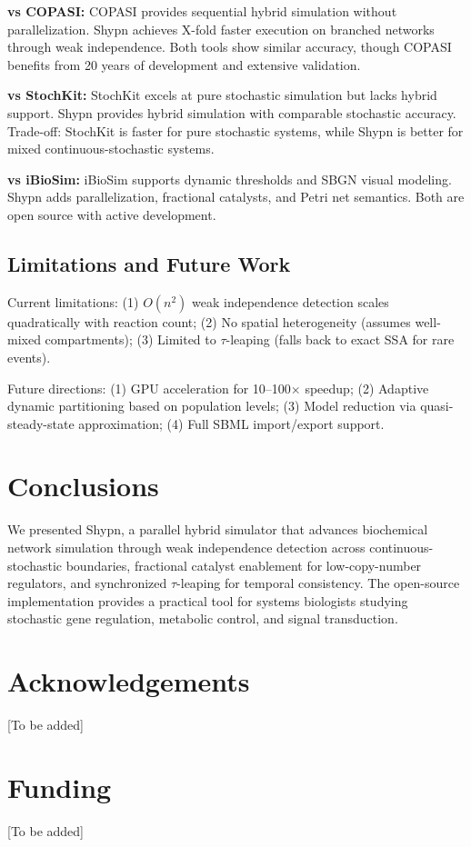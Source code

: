 \documentclass{bioinfo}
\begin{document}
\textbf{vs COPASI:} COPASI provides sequential hybrid simulation without parallelization. Shypn achieves X-fold faster execution on branched networks through weak independence. Both tools show similar accuracy, though COPASI benefits from 20 years of development and extensive validation.

\textbf{vs StochKit:} StochKit excels at pure stochastic simulation but lacks hybrid support. Shypn provides hybrid simulation with comparable stochastic accuracy. Trade-off: StochKit is faster for pure stochastic systems, while Shypn is better for mixed continuous-stochastic systems.

\textbf{vs iBioSim:} iBioSim supports dynamic thresholds and SBGN visual modeling. Shypn adds parallelization, fractional catalysts, and Petri net semantics. Both are open source with active development.

\subsection{Limitations and Future Work}

Current limitations: (1) $O(n^2)$ weak independence detection scales quadratically with reaction count; (2) No spatial heterogeneity (assumes well-mixed compartments); (3) Limited to $\tau$-leaping (falls back to exact SSA for rare events).

Future directions: (1) GPU acceleration for 10--100$\times$ speedup; (2) Adaptive dynamic partitioning based on population levels; (3) Model reduction via quasi-steady-state approximation; (4) Full SBML import/export support.

\section{Conclusions}

We presented Shypn, a parallel hybrid simulator that advances biochemical network simulation through weak independence detection across continuous-stochastic boundaries, fractional catalyst enablement for low-copy-number regulators, and synchronized $\tau$-leaping for temporal consistency. The open-source implementation provides a practical tool for systems biologists studying stochastic gene regulation, metabolic control, and signal transduction.

\section*{Acknowledgements}

[To be added]

\section*{Funding}

[To be added]



\end{document}
